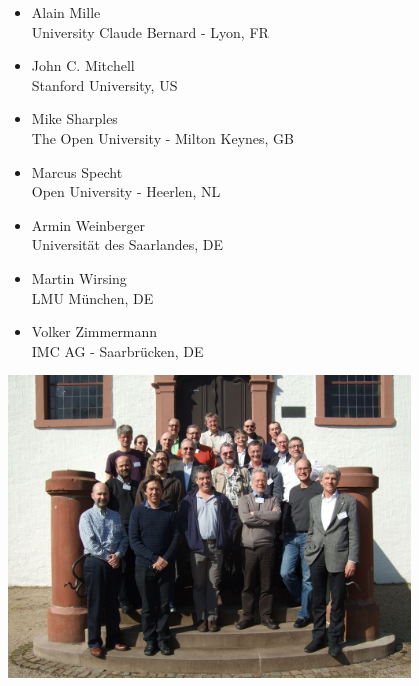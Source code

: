 \begin{minipage}[t]{0.32\linewidth} \footnotesize
\begin{itemize}
\item Alain Mille \\ University Claude Bernard - Lyon, FR
\item John C. Mitchell \\ Stanford University, US
\item Mike Sharples \\ The Open University - Milton Keynes, GB
\item Marcus Specht \\ Open University - Heerlen, NL
\item Armin Weinberger \\ Universität des Saarlandes, DE
\item Martin Wirsing \\ LMU München, DE
\item Volker Zimmermann \\IMC AG - Saarbrücken, DE
\end{itemize}
\end{minipage}

\begin{center}
  \includegraphics[height=8cm]{picture-14112.jpg}
\end{center}


